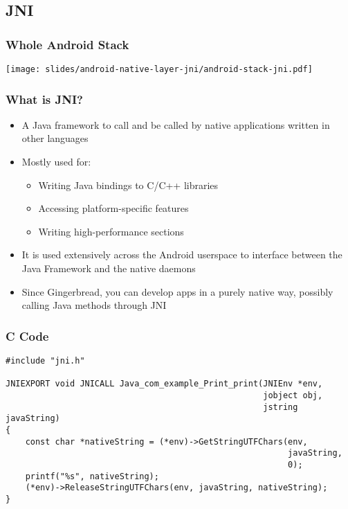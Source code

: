 \subsection{JNI}

\begin{frame}
  \frametitle{Whole Android Stack}
  \begin{center}
    \texttt{[image: slides/android-native-layer-jni/android-stack-jni.pdf]}
  \end{center}
\end{frame}

\begin{frame}
  \frametitle{What is JNI?}
  \begin{itemize}
  \item A Java framework to call and be called by native applications
    written in other languages
  \item Mostly used for:
    \begin{itemize}
    \item Writing Java bindings to C/C++ libraries
    \item Accessing platform-specific features
    \item Writing high-performance sections
    \end{itemize}
  \item It is used extensively across the Android userspace to
    interface between the Java Framework and the native daemons
  \item Since Gingerbread, you can develop apps in a purely native
    way, possibly calling Java methods through JNI
  \end{itemize}
\end{frame}

\begin{frame}[fragile]
  \frametitle{C Code}
\begin{verbatim}
#include "jni.h"

JNIEXPORT void JNICALL Java_com_example_Print_print(JNIEnv *env,
                                                    jobject obj,
                                                    jstring javaString)
{
    const char *nativeString = (*env)->GetStringUTFChars(env,
                                                         javaString,
                                                         0);
    printf("%s", nativeString);
    (*env)->ReleaseStringUTFChars(env, javaString, nativeString);
}
\end{verbatim}
\end{frame}

